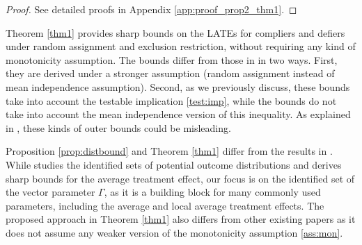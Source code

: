\documentclass[12pt]{article}
\theoremstyle{plain}
\theoremstyle{definition}
\theoremstyle{remark}
\begin{document}
\begin{proof}
    See detailed proofs in Appendix \ref{app:proof_prop2_thm1}.
\end{proof}
Theorem \ref{thm1} provides sharp bounds on the LATEs for compliers and defiers under random assignment and exclusion restriction, without requiring any kind of monotonicity assumption. The bounds differ from those in \cite{Huber2017SharpNoncompliance} in two ways. First, they are derived under a stronger assumption (random assignment instead of mean independence assumption). Second, as we previously discuss, these bounds take into account the testable implication \eqref{test:imp}, while the \cite{Huber2017SharpNoncompliance} bounds do not take into account the mean independence version of this inequality. As explained in \cite{li2024discordant}, these kinds of outer bounds could be misleading. 

Proposition \ref{prop:distbound} and Theorem \ref{thm1} differ from the results in \cite{Kitagawa2021TheIndependence}. While \cite{Kitagawa2021TheIndependence} studies the identified sets of potential outcome distributions and derives sharp bounds for the average treatment effect, our focus is on the identified set of the vector parameter $\Gamma$, as it is a building block for many commonly used parameters, including the average and local average treatment effects.
The proposed approach in Theorem \ref{thm1} also differs from other existing papers \citep{deChaisemartin2017ToleratingMonotonicity, Noack2021SensitivityAssumption, dahl2023never} as it does not assume any weaker version of the monotonicity assumption \ref{ass:mon}.   
\end{document}
